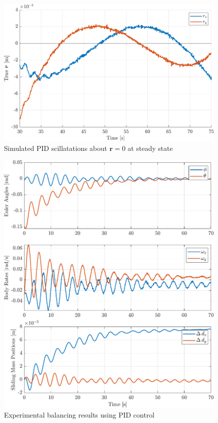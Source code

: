 \begin{figure}[!ht]
    \centering
    \includegraphics[width=\linewidth]{plots/PID_sim_oscillations.pdf}
    \caption{Simulated PID scillatations about $\bm{r}=0$ at steady state}
\end{figure}



\begin{figure}[!ht]
    \centering
    \includegraphics[width=\linewidth]{plots/PID_hardware_results.pdf}
    \caption{Experimental balancing results using PID control}
\end{figure}

